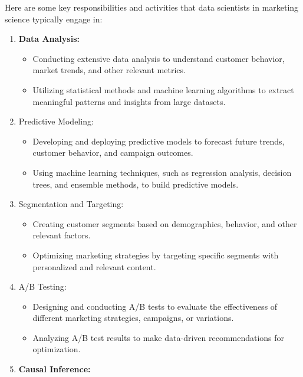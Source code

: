 \documentclass[
]{book}
\providecommand{\tightlist}{%
  \setlength{\itemsep}{0pt}\setlength{\parskip}{0pt}}
\begin{document}
Here are some key responsibilities and activities that data scientists in marketing science typically engage in:

\begin{enumerate}
\def\labelenumi{\arabic{enumi}.}
\tightlist
\item
  \textbf{Data Analysis:}

  \begin{itemize}
  \tightlist
  \item
    Conducting extensive data analysis to understand customer behavior, market trends, and other relevant metrics.
  \item
    Utilizing statistical methods and machine learning algorithms to extract meaningful patterns and insights from large datasets.
  \end{itemize}
\item
  Predictive Modeling:

  \begin{itemize}
  \tightlist
  \item
    Developing and deploying predictive models to forecast future trends, customer behavior, and campaign outcomes.
  \item
    Using machine learning techniques, such as regression analysis, decision trees, and ensemble methods, to build predictive models.
  \end{itemize}
\item
  Segmentation and Targeting:

  \begin{itemize}
  \tightlist
  \item
    Creating customer segments based on demographics, behavior, and other relevant factors.
  \item
    Optimizing marketing strategies by targeting specific segments with personalized and relevant content.
  \end{itemize}
\item
  A/B Testing:

  \begin{itemize}
  \tightlist
  \item
    Designing and conducting A/B tests to evaluate the effectiveness of different marketing strategies, campaigns, or variations.
  \item
    Analyzing A/B test results to make data-driven recommendations for optimization.
  \end{itemize}
\item
  \textbf{Causal Inference:}


\end{enumerate}
\end{document}
